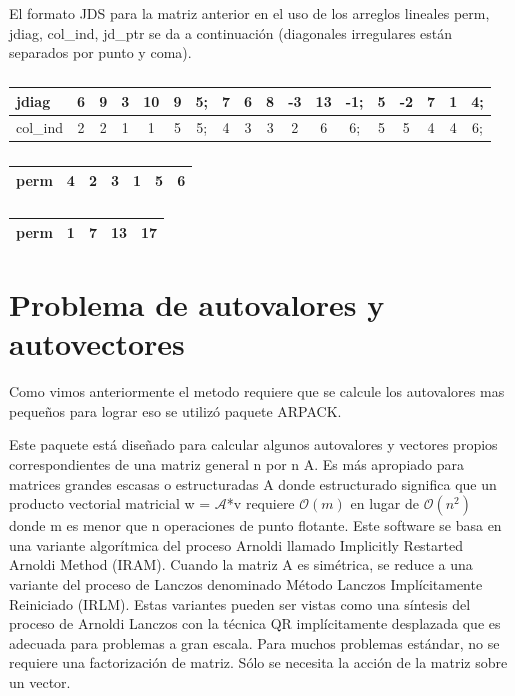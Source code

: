 \documentclass[a4paper,openright,12pt, oneside]{book}
\DeclareRobustCommand{\orderof}{\ensuremath{\mathcal{O}}}
\begin{document}
El formato JDS para la matriz anterior en el uso de los arreglos lineales {perm, jdiag, col\_ind, jd\_ptr} se da a continuaci\'on (diagonales irregulares est\'an separados por punto y coma).

\begin{table}[htdp]
    \caption{}
    \begin{tabular}{ | l || c | c | c | c | c | c | c | c | c | c | c | c | c | c | c | c | c |}
        \hline
      jdiag & 6 & 9 & 3 & 10 & 9 & 5; & 7 & 6 & 8 & -3 & 13 & -1; & 5 & -2 & 7 & 1 & 4; \\ \hline
      col\_ind & 2 & 2 & 1 & 1 & 5 & 5; & 4 & 3 & 3 & 2 & 6 & 6; & 5 & 5 & 4 & 4 & 6; \\ \hline
    \end{tabular}
\end{table}

\begin{table}[htdp]
    \caption{}
    \begin{tabular}{ | l || c | c | c | c | c | c |}
        \hline
        perm & 4 & 2 & 3 & 1 & 5 & 6 \\ \hline
    \end{tabular}
\end{table}

\begin{table}[htdp]
    \caption{}
    \begin{tabular}{ | l || c | c | c | c | }
        \hline
      perm & 1 & 7 & 13 & 17 \\ \hline
    \end{tabular}
\end{table}



\section{Problema de autovalores y autovectores}

Como vimos anteriormente el metodo requiere que se calcule los autovalores mas peque\~nos para lograr eso se utiliz\'o paquete ARPACK.

Este paquete est\'a dise\~nado para calcular algunos autovalores y vectores propios correspondientes de una matriz general n por n A. Es m\'as apropiado para matrices grandes escasas o estructuradas A donde estructurado significa que un producto vectorial matricial w = $\mathcal{A}$*v requiere $\orderof(m)$ en lugar de $\orderof(n^{2})$ donde m es menor que n operaciones de punto flotante. Este software se basa en una variante algor\'itmica del proceso Arnoldi llamado Implicitly Restarted Arnoldi Method (IRAM). Cuando la matriz A es sim\'etrica, se reduce a una variante del proceso de Lanczos denominado M\'etodo Lanczos Impl\'icitamente Reiniciado (IRLM). Estas variantes pueden ser vistas como una s\'intesis del proceso de Arnoldi\/ Lanczos con la t\'ecnica QR impl\'icitamente desplazada que es adecuada para problemas a gran escala. Para muchos problemas est\'andar, no se requiere una factorizaci\'on de matriz. S\'olo se necesita la acci\'on de la matriz sobre un vector.
\end{document}
